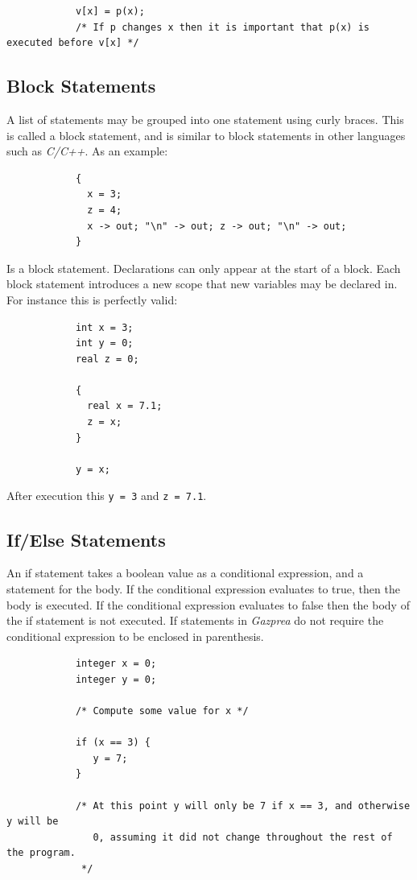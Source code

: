 \documentclass{article}
\begin{document}
		\begin{lstlisting}
			v[x] = p(x);
			/* If p changes x then it is important that p(x) is executed before v[x] */
		\end{lstlisting}

	\subsection{Block Statements}\label{sec:block}

		A list of statements may be grouped into one statement using curly braces. This is called a block statement, and
		is similar to block statements in other languages such as \textit{C/C++}. As an example:

		\begin{lstlisting}
			{
			  x = 3;
			  z = 4;
			  x -> out; "\n" -> out; z -> out; "\n" -> out;
			}
		\end{lstlisting}

		Is a block statement. Declarations can only appear at the start of a block.  Each block statement introduces a
		new scope that new variables may be declared in. For instance this is perfectly valid:

		\begin{lstlisting}
			int x = 3;
			int y = 0;
			real z = 0;

			{
			  real x = 7.1;
			  z = x;
			}

			y = x;
		\end{lstlisting}

		After execution this \texttt{y = 3} and \texttt{z = 7.1}.


	\subsection{If/Else Statements}\label{sec:conditional}

		An if statement takes a boolean value as a conditional expression, and a statement for the body. If the
		conditional expression evaluates to true, then the body is executed. If the conditional expression evaluates to
		false then the body of the if statement is not executed. If statements in \textit{Gazprea} do not require the
		conditional expression to be enclosed in parenthesis.

		\begin{lstlisting}
			integer x = 0;
			integer y = 0;

			/* Compute some value for x */

			if (x == 3) {
			   y = 7;
			}

			/* At this point y will only be 7 if x == 3, and otherwise y will be
			   0, assuming it did not change throughout the rest of the program.
			 */
		\end{lstlisting}
\end{document}
